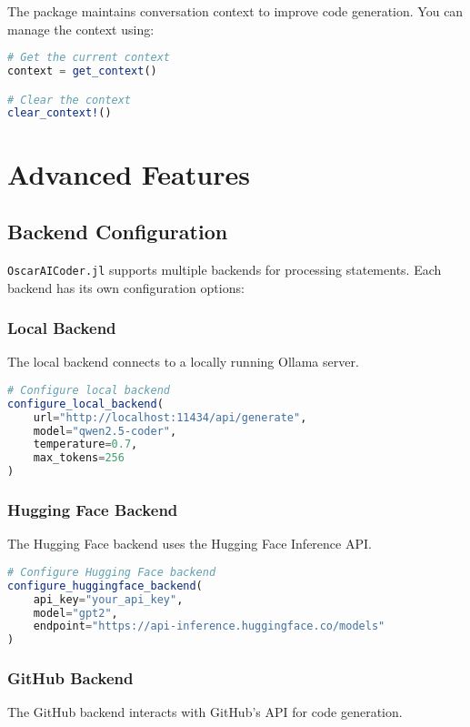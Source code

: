 \documentclass[11pt,a4paper]{article}
\newcommand{\modname}[1]{\texttt{#1}}
\begin{document}
The package maintains conversation context to improve code generation. You can manage the context using:

\begin{lstlisting}[language=Julia]
# Get the current context
context = get_context()

# Clear the context
clear_context!()
\end{lstlisting}

\section{Advanced Features}
\label{sec:advanced-features}

\subsection{Backend Configuration}
\label{subsec:backend_config}

\modname{OscarAICoder.jl} supports multiple backends for processing statements. Each backend has its own configuration options:

\subsubsection{Local Backend}
The local backend connects to a locally running Ollama server.

\begin{lstlisting}[language=Julia]
# Configure local backend
configure_local_backend(
    url="http://localhost:11434/api/generate",
    model="qwen2.5-coder",
    temperature=0.7,
    max_tokens=256
)
\end{lstlisting}

\subsubsection{Hugging Face Backend}
The Hugging Face backend uses the Hugging Face Inference API.

\begin{lstlisting}[language=Julia]
# Configure Hugging Face backend
configure_huggingface_backend(
    api_key="your_api_key",
    model="gpt2",
    endpoint="https://api-inference.huggingface.co/models"
)
\end{lstlisting}

\subsubsection{GitHub Backend}
The GitHub backend interacts with GitHub's API for code generation.
\end{document}
